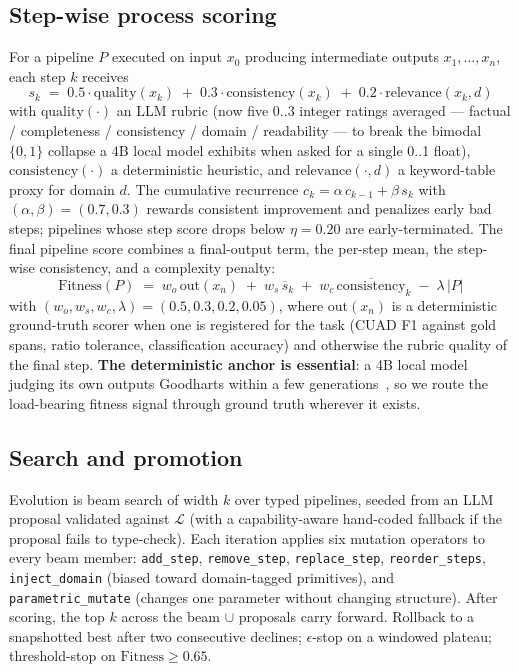 \documentclass[11pt,a4paper]{article}
\begin{document}
\subsection{Step-wise process scoring}

For a pipeline $P$ executed on input $x_0$ producing intermediate outputs $x_1, \ldots, x_n$, each step $k$ receives
\[ s_k \;=\; 0.5 \cdot \mathrm{quality}(x_k) \;+\; 0.3 \cdot \mathrm{consistency}(x_k) \;+\; 0.2 \cdot \mathrm{relevance}(x_k, d) \]
with $\mathrm{quality}(\cdot)$ an LLM rubric (now five $0..3$ integer ratings averaged --- factual / completeness / consistency / domain / readability --- to break the bimodal $\{0,1\}$ collapse a 4B local model exhibits when asked for a single 0..1 float), $\mathrm{consistency}(\cdot)$ a deterministic heuristic, and $\mathrm{relevance}(\cdot, d)$ a keyword-table proxy for domain $d$. The cumulative recurrence $c_k = \alpha\, c_{k-1} + \beta\, s_k$ with $(\alpha, \beta) = (0.7, 0.3)$ rewards consistent improvement and penalizes early bad steps; pipelines whose step score drops below $\eta = 0.20$ are early-terminated. The final pipeline score combines a final-output term, the per-step mean, the step-wise consistency, and a complexity penalty:
\[ \mathrm{Fitness}(P) \;=\; w_o \, \mathrm{out}(x_n) \;+\; w_s \, \overline{s}_k \;+\; w_c \, \overline{\mathrm{consistency}}_k \;-\; \lambda \, |P| \]
with $(w_o, w_s, w_c, \lambda) = (0.5, 0.3, 0.2, 0.05)$, where $\mathrm{out}(x_n)$ is a deterministic ground-truth scorer when one is registered for the task (CUAD F1 against gold spans, ratio tolerance, classification accuracy) and otherwise the rubric quality of the final step. \textbf{The deterministic anchor is essential}: a 4B local model judging its own outputs Goodharts within a few generations~\cite{selfprefbias2024}, so we route the load-bearing fitness signal through ground truth wherever it exists.

\subsection{Search and promotion}

Evolution is beam search of width $k$ over typed pipelines, seeded from an LLM proposal validated against $\mathcal{L}$ (with a capability-aware hand-coded fallback if the proposal fails to type-check). Each iteration applies six mutation operators to every beam member: \texttt{add\_step}, \texttt{remove\_step}, \texttt{replace\_step}, \texttt{reorder\_steps}, \texttt{inject\_domain} (biased toward domain-tagged primitives), and \texttt{parametric\_mutate} (changes one parameter without changing structure). After scoring, the top $k$ across the beam $\cup$ proposals carry forward. Rollback to a snapshotted best after two consecutive declines; $\epsilon$-stop on a windowed plateau; threshold-stop on $\mathrm{Fitness} \geq 0.65$.
\end{document}
